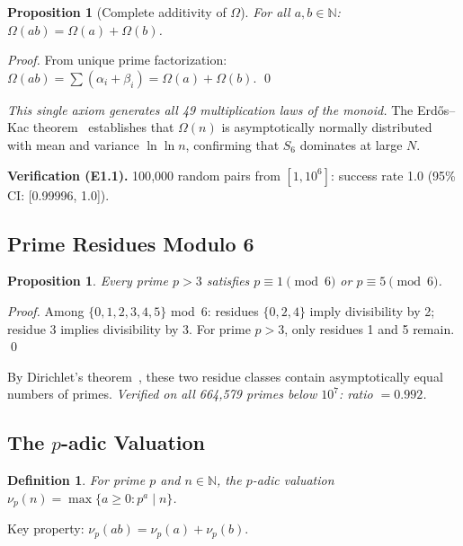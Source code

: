 \documentclass[10pt,twocolumn]{article}
\newtheorem{proposition}[theorem]{Proposition}
\newtheorem{definition}[theorem]{Definition}
\newcommand{\Om}{\Omega}
\newcommand{\N}{\mathbb{N}}
\begin{document}
\begin{proposition}[Complete additivity of $\Om$]\label{prop:omega-add}
For all $a, b \in \N$: $\Om(ab) = \Om(a) + \Om(b)$.
\end{proposition}
\begin{proof}
From unique prime factorization:
$\Om(ab) = \sum(\alpha_i + \beta_i) = \Om(a) + \Om(b)$. \qed
\end{proof}

\emph{This single axiom generates all 49 multiplication laws of the
monoid.} The Erd\H{o}s--Kac theorem~\cite{ErdosKac1940} establishes
that $\Om(n)$ is asymptotically normally distributed with mean and
variance $\ln \ln n$, confirming that $S_6$ dominates at large $N$.

\smallskip
\noindent\textbf{Verification (E1.1).} 100{,}000 random pairs from
$[1, 10^6]$: success rate 1.0 (95\% CI: [0.99996, 1.0]).

\subsection{Prime Residues Modulo 6}

\begin{proposition}\label{prop:prime-mod6}
Every prime $p > 3$ satisfies $p \equiv 1 \pmod{6}$ or
$p \equiv 5 \pmod{6}$.
\end{proposition}
\begin{proof}
Among $\{0,1,2,3,4,5\}$ mod~6: residues $\{0,2,4\}$ imply divisibility
by 2; residue 3 implies divisibility by 3. For prime $p > 3$, only
residues 1 and 5 remain. \qed
\end{proof}

By Dirichlet's theorem~\cite{Dirichlet1837}, these two residue classes
contain asymptotically equal numbers of primes. \emph{Verified on all
664{,}579 primes below $10^7$: ratio $= 0.992$.}

\subsection{The $p$-adic Valuation}

\begin{definition}\label{def:p-adic}
For prime $p$ and $n \in \N$, the \emph{$p$-adic valuation}
$\nu_p(n) = \max\{a \geq 0 : p^a \mid n\}$.
\end{definition}

Key property: $\nu_p(ab) = \nu_p(a) + \nu_p(b)$.

\end{document}
